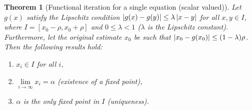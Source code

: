 \documentclass[12pt,letterpaper,DIV=11]{scrartcl}
\theoremstyle{plain}
\newtheorem{theorem}{Theorem}[section]
\theoremstyle{definition}
\theoremstyle{remark}
\begin{document}
\begin{theorem}[Functional iteration for a single equation (scalar valued)]\label{thm:iterscalar}
  Let $g(x)$ satisfy the Lipschitz condition $\left\lvert g(x) - g(y)\right\rvert \leq \lambda \left\lvert x - y\right\rvert$ for all $x, y \in I$,
  where $I = [x_0 - \rho, x_0 + \rho]$ and $0 \leq \lambda < 1$ ($\lambda$ is the Lipschitz constant).
  Furthermore, let the original estimate $x_0$ be such that $\left\lvert x_0 - g(x_0)\right\rvert \leq (1 - \lambda) \rho$.
  Then the following results hold: \begin{enumerate}
    \item $x_i \in I$ for all $i$,
    \item $\lim\limits_{i \to \infty} x_i = \alpha$ (existence of a fixed point),
    \item $\alpha$ is the only fixed point in $I$ (uniqueness).
  \end{enumerate}


\end{theorem}
\end{document}
